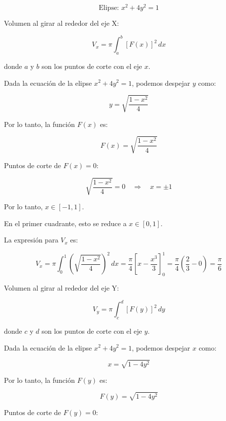 \documentclass{article}
\begin{document}
	\[
	\text{Elipse: } x^2 + 4y^2 = 1
	\]
	
	Volumen al girar al rededor del eje X:
	
	\[
	V_x = \pi \int_{a}^{b} [F(x)]^2 \,dx
	\]
	
	donde \(a\) y \(b\) son los puntos de corte con el eje \(x\).
	
	\vspace{12pt}
	
	Dada la ecuación de la elipse \(x^2 + 4y^2 = 1\), podemos despejar \(y\) como:
	
	\[
	y = \sqrt{\frac{1 - x^2}{4}}
	\]
	
	Por lo tanto, la función \(F(x)\) es:
	
	\[
	F(x) = \sqrt{\frac{1 - x^2}{4}}
	\]
	
	Puntos de corte de \(F(x) = 0\):
	
	\[
	\sqrt{\frac{1 - x^2}{4}} = 0 \quad \Rightarrow \quad x = \pm 1
	\]
	
	Por lo tanto, \(x \in [-1, 1]\). 
	
	\vspace{12pt}
	
	En el primer cuadrante, esto se reduce a \(x \in [0, 1]\).
	
	\vspace{12pt}
	
	La expresión para \(V_x\) es:
	
	\[
	V_x = \pi \int_{0}^{1} \left(\sqrt{\frac{1 - x^2}{4}}\right)^2 \,dx = \frac{\pi}{4} \left[x - \frac{x^3}{3}\right]_{0}^{1} = \frac{\pi}{4} \left(\frac{2}{3} - 0\right) = \boxed{\frac{\pi}{6}}
	\]
	

	
	
	\vspace{12pt}
	
	Volumen al girar al rededor del eje Y:
	
	\[
	V_y = \pi \int_{c}^{d} [F(y)]^2 \,dy
	\]
	
	donde \(c\) y \(d\) son los puntos de corte con el eje \(y\).
	
	\vspace{24pt}
	
	Dada la ecuación de la elipse \(x^2 + 4y^2 = 1\), podemos despejar \(x\) como:
	
	\[
	x = \sqrt{1 - 4y^2} 
	\]
	
	Por lo tanto, la función \(F(y)\) es:
	
	\[
	F(y) = \sqrt{1 - 4y^2} 
	\]
	
	Puntos de corte de \(F(y) = 0\):
	
\end{document}
